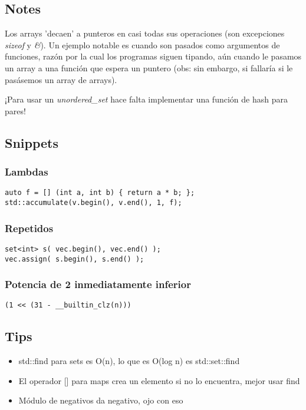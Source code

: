 

\pagebreak


\subsection{Notes}

Los arrays 'decaen' a punteros en casi todas sus operaciones (son excepciones \textit{sizeof} y \textit{\&}). Un ejemplo notable es cuando son pasados como argumentos de funciones, razón por la cual los programas siguen tipando, aún cuando le pasamos un array a una función que espera un puntero (obs: sin embargo, si fallaría si le pasásemos un array de arrays).

¡Para usar un \textit{unordered\_set} hace falta implementar una función de hash para pares!

\subsection{Snippets}

\subsubsection*{Lambdas}
\begin{lstlisting}
auto f = [] (int a, int b) { return a * b; };
std::accumulate(v.begin(), v.end(), 1, f);
\end{lstlisting}

\subsubsection*{Repetidos}
\begin{lstlisting}
set<int> s( vec.begin(), vec.end() );
vec.assign( s.begin(), s.end() );
\end{lstlisting}

\subsubsection*{Potencia de 2 inmediatamente inferior}
\begin{lstlisting}
(1 << (31 - __builtin_clz(n)))
\end{lstlisting}


\subsection{Tips}
\begin{itemize}
    \item std::find para sets es O(n), lo que es O(log n) es std::set::find
    \item El operador [] para maps crea un elemento si no lo encuentra, mejor usar find
    \item Módulo de negativos da negativo, ojo con eso
\end{itemize}
